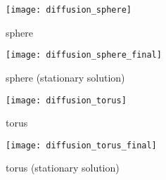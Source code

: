 \documentclass{elsart}
\begin{document}
\begin{figure}
{\center
\texttt{[image: diffusion\_sphere]}
\caption{sphere}\label{diffusion_sphere}
 }
\end{figure}


\begin{figure}
{\center
\texttt{[image: diffusion\_sphere\_final]}
\caption{sphere (stationary solution) }
\label{diffusion_sphere_final}
 }
\end{figure}

\begin{figure}
{\center
\texttt{[image: diffusion\_torus]}
\caption{torus}\label{diffusion_torus}
 }
\end{figure}


\begin{figure}
{\center
\texttt{[image: diffusion\_torus\_final]}
\caption{torus (stationary solution)}\label{diffusion_torus_final}
 }
\end{figure}
\end{document}
